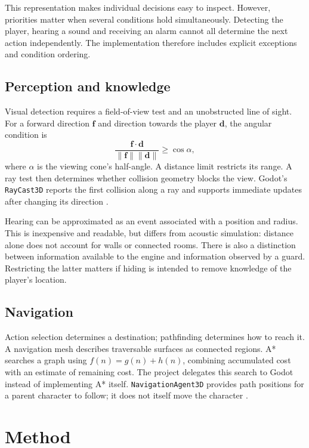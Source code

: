 \documentclass[fleqn,10pt]{SelfArx}
\begin{document}
This representation makes individual decisions easy to inspect. However, priorities matter when several conditions hold simultaneously. Detecting the player, hearing a sound and receiving an alarm cannot all determine the next action independently. The implementation therefore includes explicit exceptions and condition ordering.

\subsection{Perception and knowledge}
Visual detection requires a field-of-view test and an unobstructed line of sight. For a forward direction $\mathbf{f}$ and direction towards the player $\mathbf{d}$, the angular condition is
\begin{equation}
\frac{\mathbf{f}\cdot\mathbf{d}}{\|\mathbf{f}\|\|\mathbf{d}\|}\geq\cos\alpha,
\end{equation}
where $\alpha$ is the viewing cone's half-angle. A distance limit restricts its range. A ray test then determines whether collision geometry blocks the view. Godot's \texttt{RayCast3D} reports the first collision along a ray and supports immediate updates after changing its direction \cite{godotray}.

Hearing can be approximated as an event associated with a position and radius. This is inexpensive and readable, but differs from acoustic simulation: distance alone does not account for walls or connected rooms. There is also a distinction between information available to the engine and information observed by a guard. Restricting the latter matters if hiding is intended to remove knowledge of the player's location.

\subsection{Navigation}
Action selection determines a destination; pathfinding determines how to reach it. A navigation mesh describes traversable surfaces as connected regions. A* searches a graph using $f(n)=g(n)+h(n)$, combining accumulated cost with an estimate of remaining cost. The project delegates this search to Godot instead of implementing A* itself. \texttt{NavigationAgent3D} provides path positions for a parent character to follow; it does not itself move the character \cite{godotnav}.

\section{Method}
\end{document}
